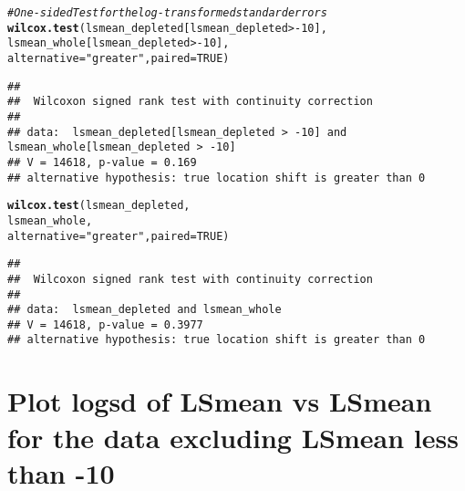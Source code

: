 \documentclass{article}\usepackage[]{graphicx}\usepackage[]{color}
\makeatletter
\newcommand{\hlnum}[1]{\textcolor[rgb]{0.686,0.059,0.569}{#1}}%
\newcommand{\hlstr}[1]{\textcolor[rgb]{0.192,0.494,0.8}{#1}}%
\newcommand{\hlcom}[1]{\textcolor[rgb]{0.678,0.584,0.686}{\textit{#1}}}%
\newcommand{\hlopt}[1]{\textcolor[rgb]{0,0,0}{#1}}%
\newcommand{\hlstd}[1]{\textcolor[rgb]{0.345,0.345,0.345}{#1}}%
\newcommand{\hlkwc}[1]{\textcolor[rgb]{0.333,0.667,0.333}{#1}}%
\newcommand{\hlkwd}[1]{\textcolor[rgb]{0.737,0.353,0.396}{\textbf{#1}}}%
\newenvironment{kframe}{%
 \def\at@end@of@kframe{}%
 \ifinner\ifhmode%
  \def\at@end@of@kframe{\end{minipage}}%
  \begin{minipage}{\columnwidth}%
 \fi\fi%
 \def\FrameCommand##1{\hskip\@totalleftmargin \hskip-\fboxsep
 \colorbox{shadecolor}{##1}\hskip-\fboxsep
     \hskip-\linewidth \hskip-\@totalleftmargin \hskip\columnwidth}%
 \MakeFramed {\advance\hsize-\width
   \@totalleftmargin\z@ \linewidth\hsize
   \@setminipage}}%
 {\par\unskip\endMakeFramed%
 \at@end@of@kframe}
\newenvironment{knitrout}{}{} %
\makeatother
\begin{document}
\begin{knitrout}
\color{fgcolor}\begin{kframe}
\begin{alltt}
\hlcom{# One-sided Test for the log-transformed standard errors}
\hlkwd{wilcox.test}\hlstd{(lsmean_depleted[lsmean_depleted} \hlopt{>-}\hlnum{10}\hlstd{],}
            \hlstd{lsmean_whole[lsmean_depleted} \hlopt{>-}\hlnum{10}\hlstd{],}
            \hlkwc{alternative} \hlstd{=}\hlstr{"greater"}\hlstd{,} \hlkwc{paired} \hlstd{=} \hlnum{TRUE}\hlstd{)}
\end{alltt}
\begin{verbatim}
## 
## 	Wilcoxon signed rank test with continuity correction
## 
## data:  lsmean_depleted[lsmean_depleted > -10] and lsmean_whole[lsmean_depleted > -10]
## V = 14618, p-value = 0.169
## alternative hypothesis: true location shift is greater than 0
\end{verbatim}
\begin{alltt}
\hlkwd{wilcox.test}\hlstd{(lsmean_depleted,}
            \hlstd{lsmean_whole,}
            \hlkwc{alternative} \hlstd{=}\hlstr{"greater"}\hlstd{,} \hlkwc{paired} \hlstd{=} \hlnum{TRUE}\hlstd{)}
\end{alltt}
\begin{verbatim}
## 
## 	Wilcoxon signed rank test with continuity correction
## 
## data:  lsmean_depleted and lsmean_whole
## V = 14618, p-value = 0.3977
## alternative hypothesis: true location shift is greater than 0
\end{verbatim}
\end{kframe}
\end{knitrout}



\section{Plot logsd of LSmean vs LSmean for the data excluding LSmean less than -10}
\end{document}

